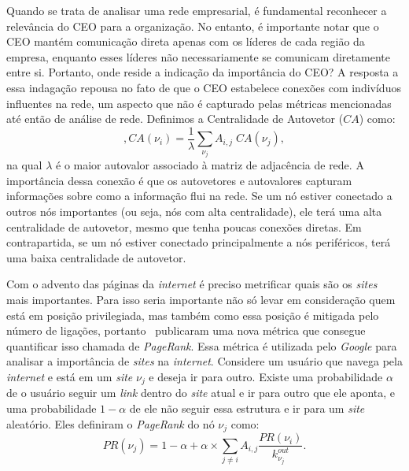 Quando se trata de analisar uma rede empresarial, é fundamental reconhecer a relevância do CEO para a organização. No entanto, é importante notar que o CEO mantém comunicação direta apenas com os líderes de cada região da empresa, enquanto esses líderes não necessariamente se comunicam diretamente entre si. Portanto, onde reside a indicação da importância do CEO? A resposta a essa indagação repousa no fato de que o CEO estabelece conexões com indivíduos influentes na rede, um aspecto que não é capturado pelas métricas 
mencionadas até então
de análise de rede. Definimos a Centralidade de Autovetor ($CA$) como:
\begin{equation},
  CA(\nu_i) = \frac{1}{\lambda}\sum_{\nu_j}A_{i,j}\; CA(\nu_j),
\end{equation}
na qual $\lambda$ é o maior autovalor associado à matriz de adjacência de rede. A importância dessa conexão é que os autovetores e autovalores capturam informações sobre como a informação flui na rede. Se um nó estiver conectado a outros nós importantes (ou seja, nós com alta centralidade), ele terá uma alta centralidade de autovetor, mesmo que tenha poucas conexões diretas. Em contrapartida, se um nó estiver conectado principalmente a nós periféricos, terá uma baixa centralidade de autovetor.

Com o advento das páginas da \textit{internet} é preciso metrificar quais são os \textit{sites} mais importantes. Para isso seria importante não só levar em consideração quem está em posição privilegiada, mas também como essa posição é mitigada pelo número de ligações, portanto~\cite{page1999pagerank} publicaram uma nova métrica que consegue quantificar isso chamada de \textit{PageRank}. Essa métrica é utilizada pelo \textit{Google} para analisar a importância de \textit{sites} na \textit{internet}. Considere um usuário que navega pela \textit{internet} e está em um \textit{site} $\nu_j$ e deseja ir para outro. Existe uma probabilidade $\alpha$ de o usuário seguir um \textit{link} dentro do \textit{site} atual e ir para outro que ele aponta, e uma probabilidade $1 - \alpha$ de ele não seguir essa estrutura e ir para um \textit{site} aleatório. Eles definiram o \textit{PageRank} do nó $\nu_j$ como:
\begin{equation}
    PR(\nu_j) =1 - \alpha + \alpha\times \sum_{j \neq i} A_{i,j}\frac{PR(\nu_i)}{k^{out}_{\nu_j}}.
\end{equation}

